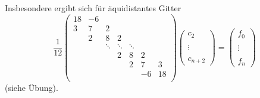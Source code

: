     Insbesondere ergibt sich für äquidistantes Gitter
    \begin{equation*}
      \frac{1}{12}
      \left(\begin{array}{ccccccc}
              18& -6&&&&&\\
              3&7&2&  &&&\\
                &2&8&2  &&&\\
                & &\ddots &\ddots &\ddots &&\\
                & & & 2&8&2&\\
                & & & &2&7&3\\
                & & &&&-6&18\\
            \end{array}\right) 
          \left(\begin{array}{c}
                  c_2\\ \\ \vdots \\ \\c_{n+2}
                \end{array}\right)
              =
              \left(\begin{array}{c}
                      f_0\\ \\ \vdots \\ \\f_n
                    \end{array}\right)
                \end{equation*}
                (siehe Übung).


